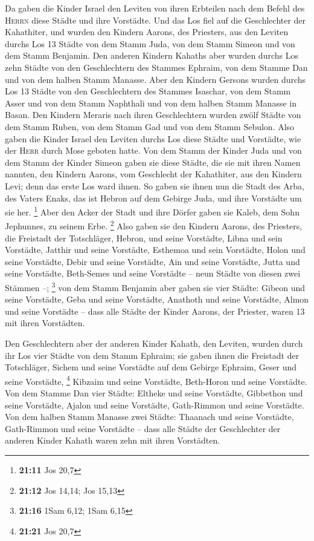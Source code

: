  Da gaben die Kinder Israel den Leviten von ihren
Erbteilen nach dem Befehl des \textsc{Herrn} diese Städte und ihre
Vorstädte.  Und das Los fiel auf die Geschlechter der
Kahathiter, und wurden den Kindern Aarons, des Priesters, aus den
Leviten durchs Los 13 Städte von dem Stamm Juda, von dem Stamm Simeon
und von dem Stamm Benjamin.  Den anderen Kindern Kahaths
aber wurden durchs Los zehn Städte von den Geschlechtern des Stammes
Ephraim, von dem Stamme Dan und von dem halben Stamm Manasse.
 Aber den Kindern Gersons wurden durchs Los 13 Städte von
den Geschlechtern des Stammes Isaschar, von dem Stamm Asser und von dem
Stamm Naphthali und von dem halben Stamm Manasse in Basan.
 Den Kindern Meraris nach ihren Geschlechtern wurden zwölf
Städte von dem Stamm Ruben, von dem Stamm Gad und von dem Stamm Sebulon.
 Also gaben die Kinder Israel den Leviten durchs Los diese
Städte und Vorstädte, wie der \textsc{Herr} durch Mose geboten hatte.
 Von dem Stamm der Kinder Juda und von dem Stamm der
Kinder Simeon gaben sie diese Städte, die sie mit ihren Namen nannten,
 den Kindern Aarons, vom Geschlecht der Kahathiter, aus
den Kindern Levi; denn das erste Los ward ihnen.  So
gaben sie ihnen nun die Stadt des Arba, des Vaters Enaks, das ist Hebron
auf dem Gebirge Juda, und ihre Vorstädte um sie her. \footnote{\textbf{21:11}
  Jos 20,7}  Aber den Acker der Stadt und ihre Dörfer
gaben sie Kaleb, dem Sohn Jephunnes, zu seinem Erbe. \footnote{\textbf{21:12}
  Jos 14,14; Jos 15,13}  Also gaben sie den Kindern
Aarons, des Priesters, die Freistadt der Totschläger, Hebron, und seine
Vorstädte, Libna und sein Vorstädte,  Jatthir und seine
Vorstädte, Esthemoa und sein Vorstädte,  Holon und seine
Vorstädte, Debir und seine Vorstädte,  Ain und seine
Vorstädte, Jutta und seine Vorstädte, Beth-Semes und seine Vorstädte --
neun Städte von diesen zwei Stämmen --; \footnote{\textbf{21:16} 1Sam
  6,12; 1Sam 6,15}  von dem Stamm Benjamin aber gaben sie
vier Städte: Gibeon und seine Vorstädte, Geba und seine Vorstädte,
 Anathoth und seine Vorstädte, Almon und seine Vorstädte
--  dass alle Städte der Kinder Aarons, der Priester,
waren 13 mit ihren Vorstädten.

 Den Geschlechtern aber der anderen Kinder Kahath, den
Leviten, wurden durch ihr Los vier Städte von dem Stamm Ephraim;
 sie gaben ihnen die Freistadt der Totschläger, Sichem
und seine Vorstädte auf dem Gebirge Ephraim, Geser und seine Vorstädte,
\footnote{\textbf{21:21} Jos 20,7}  Kibzaim und seine
Vorstädte, Beth-Horon und seine Vorstädte.  Von dem
Stamme Dan vier Städte: Eltheke und seine Vorstädte, Gibbethon und seine
Vorstädte,  Ajalon und seine Vorstädte, Gath-Rimmon und
seine Vorstädte.  Von dem halben Stamm Manasse zwei
Städte: Thaanach und seine Vorstädte, Gath-Rimmon und seine Vorstädte --
 dass alle Städte der Geschlechter der anderen Kinder
Kahath waren zehn mit ihren Vorstädten.

